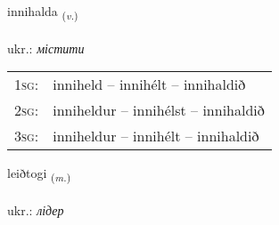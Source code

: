\documentclass[frontgrid, backgrid]{flacards}\usepackage[]{graphicx}\usepackage[]{xcolor}
\begin{document}
\renewcommand{\flhead}{\vskip5pt \fboxsep=0pt {\small\bfseries\footnotesize Sagnorð | дієслово}}
\renewcommand{\fcfoot}{\vskip5pt \fboxsep=0pt \hspace{2pt}{\small\bfseries\footnotesize 2K}}

\renewcommand{\blhead}{\vskip5pt {\small\bfseries\footnotesize Sagnorð | дієслово }}
\renewcommand{\bcfoot}{\vskip5pt \hspace{2pt}{\small\bfseries\footnotesize 2K}}


{innihalda \small{\textsubscript{(\textit{v.})}} \\[1ex] %
\textphonetic{[ɪnɪhalta]} \\
ukr.: \emph{містити} \\  [2ex]
\renewcommand*{\arraystretch}{0.8}
\begin{tabular}{p{1cm}l}
\textsc{1sg}: & inniheld -- innihélt -- innihaldið \\ 
\textsc{2sg}: & inniheldur -- innihélst -- innihaldið \\ 
\textsc{3sg}: & inniheldur -- innihélt -- innihaldið \\ 
\end{tabular}
}

\renewcommand{\flhead}{\vskip5pt \fboxsep=0pt {\small\bfseries\footnotesize Nafnorð | іменник}}
\renewcommand{\fcfoot}{\vskip5pt \fboxsep=0pt \hspace{2pt}{\small\bfseries\footnotesize 2K}}

\renewcommand{\blhead}{\vskip5pt {\small\bfseries\footnotesize Nafnorð | іменник }}
\renewcommand{\bcfoot}{\vskip5pt \hspace{2pt}{\small\bfseries\footnotesize 2K}}


{leiðtogi \small{\textsubscript{(\textit{m.})}} \\[1ex] %
\textphonetic{[leiðtʰɔijɪ]} \\
ukr.: \emph{лідер} \\  [2ex]
\renewcommand*{\arraystretch}{0.8}
}
\end{document}
